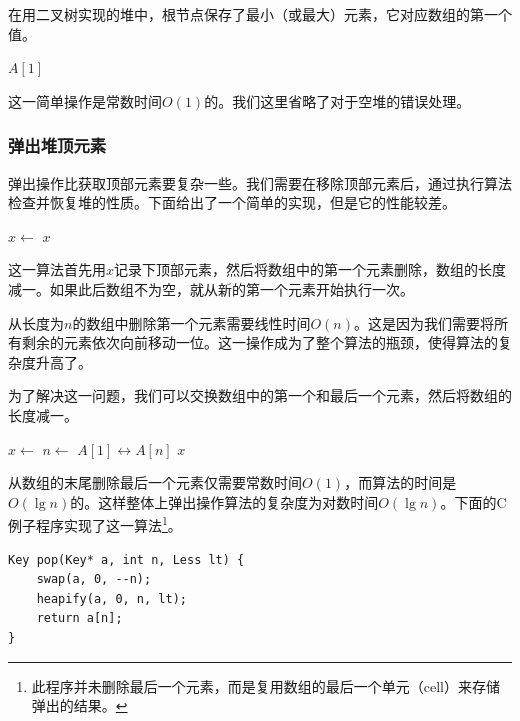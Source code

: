 \documentclass[b5paper]{ctexart}
\begin{document}
在用二叉树实现的堆中，根节点保存了最小（或最大）元素，它对应数组的第一个值。

\begin{algorithmic}[1]
  \State \Return $A[1]$
\EndFunction
\end{algorithmic}

这一简单操作是常数时间$O(1)$的。我们这里省略了对于空堆的错误处理。

\subsubsection{弹出堆顶元素}

弹出操作比获取顶部元素要复杂一些。我们需要在移除顶部元素后，通过执行算法检查并恢复堆的性质。下面给出了一个简单的实现，但是它的性能较差。

\begin{algorithmic}[1]
  \State $x \gets$ 
  \State {}
    \State {}
  \EndIf
  \State \Return $x$
\EndFunction
\end{algorithmic}

这一算法首先用$x$记录下顶部元素，然后将数组中的第一个元素删除，数组的长度减一。如果此后数组不为空，就从新的第一个元素开始执行一次。

从长度为$n$的数组中删除第一个元素需要线性时间$O(n)$。这是因为我们需要将所有剩余的元素依次向前移动一位。这一操作成为了整个算法的瓶颈，使得算法的复杂度升高了。

为了解决这一问题，我们可以交换数组中的第一个和最后一个元素，然后将数组的长度减一。

\begin{algorithmic}[1]
  \State $x \gets$ 
  \State $n \gets$ 
  \State {} $A[1] \leftrightarrow A[n]$
  \State {}
    \State {}
  \EndIf
  \State \Return $x$
\EndFunction
\end{algorithmic}

从数组的末尾删除最后一个元素仅需要常数时间$O(1)$，而算法的时间是$O(\lg n)$的。这样整体上弹出操作算法的复杂度为对数时间$O(\lg n)$。下面的C例子程序实现了这一算法\footnote{此程序并未删除最后一个元素，而是复用数组的最后一个单元（cell）来存储弹出的结果。}。

\lstset{language=C}
\begin{lstlisting}
Key pop(Key* a, int n, Less lt) {
    swap(a, 0, --n);
    heapify(a, 0, n, lt);
    return a[n];
}
\end{lstlisting}
\end{document}
